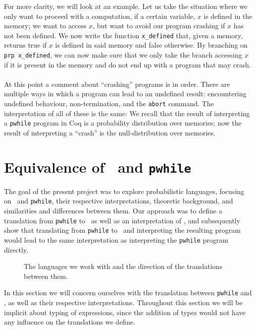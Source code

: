 \documentclass[11pt, leqno, titlepage]{article}
\theoremstyle{definition}
\begin{document}
For more clarity, we will look at an example. Let us take the situation where we only
want to proceed with a computation, if a certain variable, $x$ is defined in the
memory; we want to access $x$, but want to avoid our program crashing if $x$ has not
been defined. We now write the function \texttt{x\_defined} that, given a memory,
returns true if $x$ is defined in said memory and false otherwise. By branching on
\texttt{prp x\_defined}, we can now make sure that we only take the branch accessing
$x$ if it is present in the memory and do not end up with a program that may
crash. \\
\\
At this point a comment about ``crashing'' programs is in order. There are multiple
ways in which a program can lead to an undefined result: encountering undefined
behaviour, non-termination, and the \texttt{abort} command. The interpretation of all
of these is the same: We recall that the result of interpreting a \texttt{pwhile}
program in Coq is a probability distribution over memories; now the result of
interpreting a ``crash'' is the null-distribution over memories.


\section{Equivalence of \rml\ and \texttt{pwhile}}
\label{sec:approach}
The goal of the present project was to explore probabilistic languages, focusing on
\rml\ and \texttt{pwhile}, their respective interpretations, theoretic background,
and similarities and differences between them. Our approach was to define a
translation from \texttt{pwhile} to \rml\ as well as an interpretation of \rml,
and subsequently show that translating from \texttt{pwhile} to \rml\ and interpreting
the resulting program would lead to the same interpretation as interpreting the
\texttt{pwhile} program directly.

\begin{figure}[h]
  \centering
  \caption{The languages we work with and the direction of the translations between
    them. }
  \label{fig:triangle}
\end{figure}

In this section we will concern ourselves with the translation between
\texttt{pwhile} and \rml, as well as their respective interpretations. Throughout
this section we will be implicit about typing of expressions, since the addition of
types would not have any influence on the translations we define. 
\end{document}
